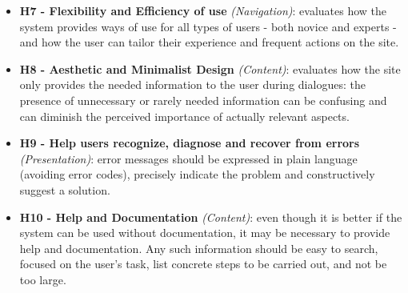 \documentclass[11pt]{article} %
\begin{document}
\begin{itemize}
    \item \textbf{H7 - Flexibility and Efficiency of use} \textit{(Navigation)}: evaluates how the system provides ways of use for all types of users - both novice and experts - and how the user can tailor their experience and frequent actions on the site.
    \item \textbf{H8 - Aesthetic and Minimalist Design} \textit{(Content)}: evaluates how the site only provides the needed information to the user during dialogues: the presence of unnecessary or rarely needed information can be confusing and can diminish the perceived importance of actually relevant aspects. 
    \item \textbf{H9 - Help users recognize, diagnose and recover from errors} \textit{(Presentation)}: error messages should be expressed in plain language (avoiding error codes), precisely indicate the problem and constructively suggest a solution.
    \item \textbf{H10 - Help and Documentation} \textit{(Content)}: even though it is better if the system can be used without documentation, it may be necessary to provide help and documentation. Any such information should be easy to search, focused on the user's task, list concrete steps to be carried out, and not be too large.
\end{itemize}
\end{document}
